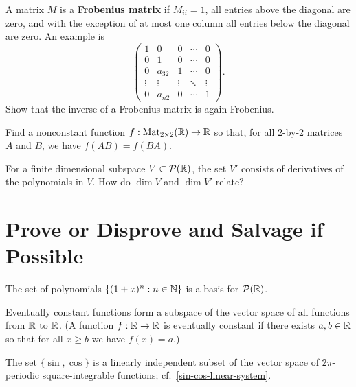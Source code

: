 \documentclass{homework}
\begin{document}
\begin{problem}\label{frobenius-matrix}A matrix $M$ is a \textbf{Frobenius matrix} if $M_{ii} = 1$, all
  entries above the diagonal are zero, and with the exception of at
  most one column all entries below the diagonal are zero.  An example is
  \[\begin{pmatrix}
      1&0&0&\cdots &0\\
      0&1&0&\cdots &0\\
      0&a_{32}&1&\cdots &0\\
      \vdots &\vdots &\vdots &\ddots &\vdots \\
      0&a_{n2}&0&\cdots &1
    \end{pmatrix}.\]
  Show that the inverse of a Frobenius matrix is again Frobenius.
\end{problem}

\begin{problem}
  Find a nonconstant function $f : \operatorname{Mat}_{2\times 2}(\mathbb{R}) \to \mathbb{R}$ so that, for all
  $2$-by-$2$ matrices $A$ and $B$, we have $f(AB) = f(BA)$.
\end{problem}

\begin{problem}
  For a finite dimensional subspace $V \subset \mathcal{P}(\mathbb{R})$, the
  set $V'$ consists of derivatives of the polynomials in $V$.  How do
  $\dim V$ and $\dim V'$ relate?
\end{problem}

\section{Prove or Disprove and Salvage if Possible}

\begin{problem}
  The set of polynomials $\{ (1+x)^n : n \in \mathbb{N} \}$ is a basis for
  $\mathcal{P}(\mathbb{R})$.
\end{problem}

\begin{problem}\label{eventually-constant}Eventually constant functions form a subspace of the vector space of
  all functions from $\mathbb{R}$ to $\mathbb{R}$.  (A function $f : \mathbb{R} \to \mathbb{R}$ is
  eventually constant if there exists $a,b \in \mathbb{R}$ so that for all
  $x \geq b$ we have $f(x) = a$.)
\end{problem}

\begin{problem}\label{sin-cos-indie}The set $\{ \sin, \cos \}$ is a linearly independent subset of the
  vector space of $2\pi$-periodic square-integrable functions;
  cf.~\ref{sin-cos-linear-system}.
\end{problem}
\end{document}

